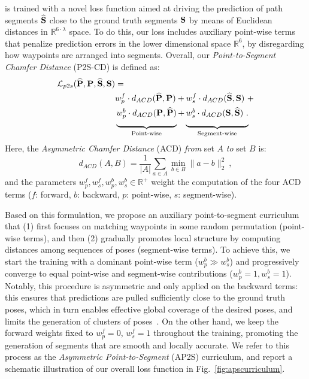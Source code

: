 \ours is trained with a novel loss function aimed at driving the prediction of path segments $\mathbf{\widehat{S}}$ close to the ground truth segments $\mathbf{S}$ by means of Euclidean distances in $\mathbb{R}^{6\cdot\lambda}$ space.
To do this, our loss includes auxiliary point-wise terms that penalize prediction errors in the lower dimensional space $\mathbb{R}^{6}$, by disregarding how waypoints are arranged into segments.
Overall, our \emph{Point-to-Segment Chamfer Distance} (P2S-CD) is defined as:
\begin{equation}
\label{eq:pscd}
\begin{split}
    \mathcal{L}_{p2s}(\bPhat ,\bP,\bShat ,\bS) & = \\
    & w^{f}_{p} \cdot d_{ACD}(\bPhat , \bP) + w^{f}_{s} \cdot d_{ACD}(\bShat , \bS) \ + \\
    & \underbrace{\raisebox{10pt}{$w^{b}_{p} \cdot d_{ACD}( \bP,\bPhat)$}}_{\text{Point-wise}} \raisebox{10pt}{$+$} \underbrace{\raisebox{10pt}{$w^{b}_{s} \cdot d_{ACD}(\bS,\bShat)$~.}}_{\text{Segment-wise}}
\end{split}
\end{equation} 
Here, the \emph{Asymmetric Chamfer Distance} (ACD) \emph{from} set $A$ \emph{to} set $B$ is: 
\begin{equation}
    d_{ACD}(A, B) = \frac{1}{|A|} \sum _{a\in A}\min_{b\in B} \| a-b\| _{2}^{2}~,
\end{equation}
and the parameters $w^f_p, w^f_s, w^b_p, w^b_s \in \mathbb{R}^{+}$ weight the computation of the four ACD terms ($f$: forward, $b$: backward, $p$: point-wise, $s$: segment-wise). 

Based on this formulation, we propose an auxiliary point-to-segment curriculum that (1) first focuses on matching waypoints in some random permutation (point-wise terms), and then (2) gradually promotes local structure by computing distances among sequences of poses (segment-wise terms).
%
To achieve this, we start the training with a dominant point-wise term ($w^b_p {\gg} w^b_s$) and progressively converge to equal point-wise and segment-wise contributions ($w^b_p{=}1, w^b_s{=}1$).
Notably, this procedure is asymmetric and only applied on the backward terms: this ensures that predictions are pulled sufficiently close to the ground truth poses, which in turn enables effective global coverage of the desired poses, and limits the generation of clusters of poses~\cite{densityawarecd}.
%
On the other hand, we keep the forward weights fixed to $w^f_p{=}0$, $w^f_s{=}1$ throughout the training, promoting the generation of segments that are smooth and locally accurate.
%
We refer to this process as the \emph{Asymmetric Point-to-Segment} (AP2S) curriculum, and report a schematic illustration of our overall loss function in Fig.~\ref{fig:apscurriculum}.

